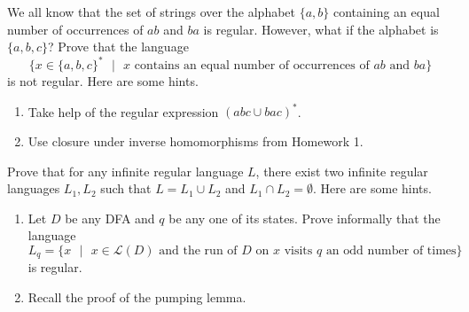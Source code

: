 \documentclass[10pt,addpoints]{exam}
\begin{document}
\newpage
\begin{prob}
We all know that the set of strings over the alphabet $\{a,b\}$ containing an equal number of occurrences of $ab$ and $ba$ is regular. However, what if the alphabet is $\{a,b,c\}$? Prove that the language
\[\{x\in\{a,b,c\}^*\text{ }|\text{ }x\text{ contains an equal number of occurrences of }ab\text{ and }ba\}\]
is not regular. Here are some hints.
\begin{enumerate}
\item Take help of the regular expression $(abc\cup bac)^*$.
\item Use closure under inverse homomorphisms from Homework 1.
\end{enumerate}
\end{prob}



\newpage
\begin{prob}
Prove that for any infinite regular language $L$, there exist two infinite regular languages $L_1,L_2$ such that $L=L_1\cup L_2$ and $L_1\cap L_2=\emptyset$. Here are some hints.
\begin{enumerate}
\item Let $D$ be any DFA and $q$ be any one of its states. Prove informally that the language
\[L_q=\{x\text{ }|\text{ }x\in\mathcal{L}(D)\text{ and the run of }D\text{ on }x\text{ visits }q\text{ an odd number of times}\}\]
is regular.
\item Recall the proof of the pumping lemma.
\end{enumerate}
\end{prob}


\end{document}
